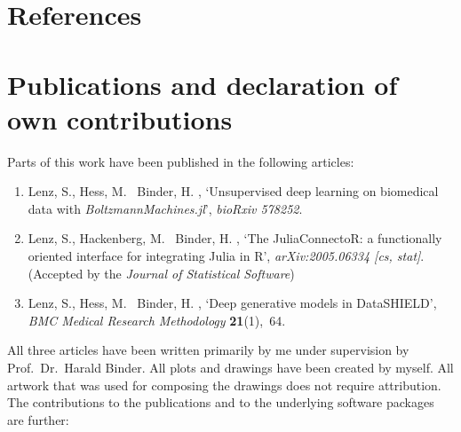 \documentclass[12pt]{article}
\newcommand{\apkg}[1]{\emph{#1}}
\begin{document}
\begin{appendices}
\singlespacing
\section{References}

\renewcommand{\bibsection}{} %



\clearpage
\onehalfspacing
\section[Publications and declaration of own contributions]{Publications and declaration of \\ own contributions}
Parts of this work have been published in the following articles:

\begin{enumerate}[(1)]
\item
Lenz, S., Hess, M. \harvardand\ Binder, H.  \harvardyearright , `Unsupervised deep learning on biomedical data with \apkg{BoltzmannMachines.jl}', {\em bioRxiv 578252}.
\newline{}

\item 
Lenz, S., Hackenberg, M. \harvardand\ Binder, H.  \harvardyearright , `The {JuliaConnectoR}: a functionally oriented
  interface for integrating {Julia} in {R}', {\em arXiv:2005.06334 [cs, stat]}. 
  \newline(Accepted by the {\em Journal of Statistical Software})
\newline{}

\item
Lenz, S., Hess, M. \harvardand\ Binder, H.  \harvardyearright , `Deep generative models in {DataSHIELD}', {\em BMC
  Medical Research Methodology} {\bf 21}(1),~64.
\newline{}
\end{enumerate}

All three articles have been written primarily by me under supervision by Prof.~Dr.~Harald Binder. 
All plots and drawings have been created by myself.
All artwork that was used for composing the drawings does not require attribution.
The contributions to the publications and to the underlying software packages are further:


\end{appendices}
\end{document}
